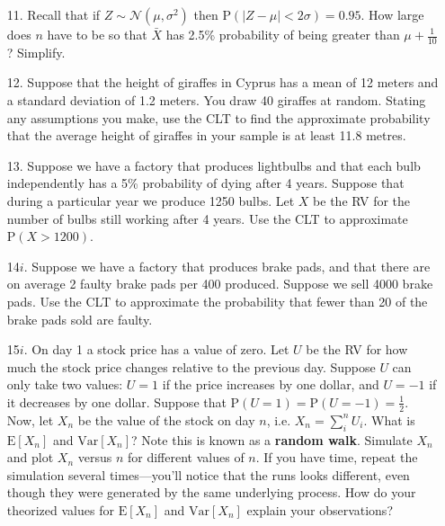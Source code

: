 \documentclass[10pt]{extarticle}
\newcommand{\E}{\text{E}}
\newcommand{\Var}{\text{Var}}
\renewcommand{\P}{\text{P}}
\begin{document}
\hfill 

\begin{itemize}

	\item[11.] Recall that if $Z \sim \mathcal N(\mu, \sigma^2)$ then $\P(| Z - \mu| < 2\sigma) = 0.95$. How large does $n$ have to be so that $\bar X$ has 2.5\% probability of being greater than $\mu + \frac{1}{10}$? Simplify. \\ 

	\item[12.] Suppose that the height of giraffes in Cyprus has a mean of 12 meters and a standard deviation of 1.2 meters. You draw 40 giraffes at random. Stating any assumptions you make, use the CLT to find the approximate probability that the average height of giraffes in your sample is at least 11.8 metres. \\

	\item[13.] Suppose we have a factory that produces lightbulbs and that each bulb independently has a 5\% probability of dying after 4 years. Suppose that during a particular year we produce 1250 bulbs. Let $X$ be the RV for the number of bulbs still working after 4 years. Use the CLT to approximate $\P(X > 1200)$. \\  

	\item[14$i$.] Suppose we have a factory that produces brake pads, and that there are on average 2 faulty brake pads per 400 produced. Suppose we sell 4000 brake pads. Use the CLT to approximate the probability that fewer than 20 of the brake pads sold are faulty. \\  

	\item[15$i$.] On day 1 a stock price has a value of zero. Let $U$ be the RV for how much the stock price changes relative to the previous day. Suppose $U$ can only take two values: $U=1$ if the price increases by one dollar, and $U = -1$ if it decreases by one dollar. Suppose that $\P(U=1) = \P(U=-1) = \frac 12$. Now, let $X_n$ be the value of the stock on day $n$, i.e. $X_n = \sum_i^n U_i$. What is $\E[X_n]$ and $\Var[X_n]$? Note this is known as a {\bf random walk}. Simulate $X_n$ and plot $X_n$ versus $n$ for different values of $n$. If you have time, repeat the simulation several times---you'll notice that the runs looks different, even though they were generated by the same underlying process. How do your theorized values for $\E[X_n]$ and $\Var[X_n]$ explain your observations? 

\end{itemize}
\end{document}
